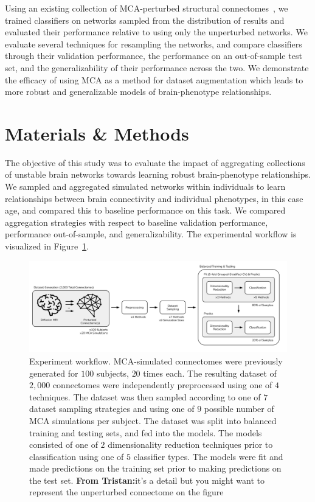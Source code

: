 \documentclass[10pt]{SelfArx} %
\newcommand{\tristan}[1]{\color{orange}\textbf{From Tristan:}#1\color{black}}
\begin{document}
Using an existing collection of MCA-perturbed structural connectomes~\cite{Kiar2020-yz}, we trained classifiers on
networks sampled from the distribution of results and evaluated their performance relative to using only the
unperturbed networks. We evaluate several techniques for resampling the networks, and compare classifiers through their
validation performance, the performance on an out-of-sample test set, and the generalizability of their performance
across the two. We demonstrate the efficacy of using MCA as a method for dataset augmentation which leads to more
robust and generalizable models of brain-phenotype relationships.


\section*{Materials \& Methods}

The objective of this study was to evaluate the impact of aggregating collections of unstable brain networks towards
learning robust brain-phenotype relationships. We sampled and aggregated simulated networks within individuals to learn
relationships between brain connectivity and individual phenotypes, in this case age, and compared this to baseline
performance on this task. We compared aggregation strategies with respect to baseline validation performance,
performance out-of-sample, and generalizability. The experimental workflow is visualized in Figure~\ref{fig:workflow}.

\begin{figure}[bth!]\centering
\includegraphics[width=\linewidth]{figures/0.pdf}
\caption{Experiment workflow. MCA-simulated connectomes were previously generated for $100$ subjects, $20$ times each.
The resulting dataset of $2,000$ connectomes were independently preprocessed using one of $4$ techniques. The dataset
was then sampled according to one of $7$ dataset sampling strategies and using one of $9$ possible number of MCA
simulations per subject. The dataset was split into balanced training and testing sets, and fed into the models. The
models consisted of one of $2$ dimensionality reduction techniques prior to classification using one of $5$ classifier
types. The models were fit and made predictions on the training set prior to making predictions on the test set.
\tristan{it's a detail but you might want to represent the unperturbed connectome on the figure}}
\label{fig:workflow}
\end{figure}
\end{document}
